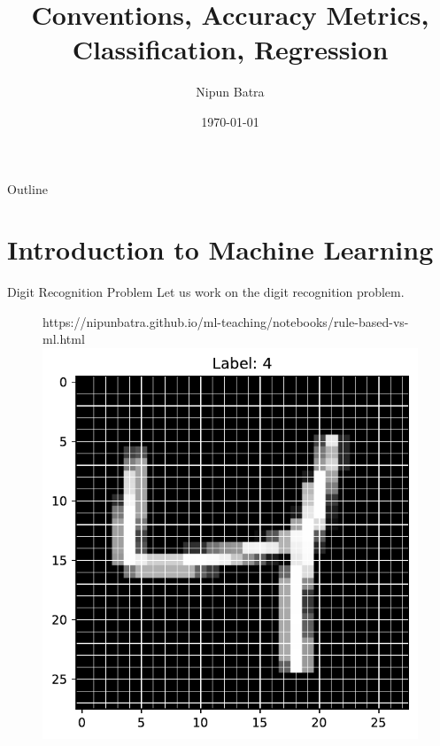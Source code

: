 \documentclass[dvipsnames]{beamer}
\title{Conventions, Accuracy Metrics, Classification, Regression}
\date{\today}
\author{Nipun Batra}
\institute{IIT Gandhinagar}
\begin{document}
%


  \maketitle
  
  \begin{frame}{Outline}
    \tableofcontents
  \end{frame}

  \section{Introduction to Machine Learning}
  
  \begin{frame}{Digit Recognition Problem}
  Let us work on the digit recognition problem.

		\begin{figure}[htp]
			\centering
			\begin{notebookbox}{https://nipunbatra.github.io/ml-teaching/notebooks/rule-based-vs-ml.html}
			  \includegraphics[scale=0.35]{../assets/accuracy-convention/figures/mnist.pdf}
			\end{notebookbox}
		  \end{figure}

	\end{frame}
\end{document}
